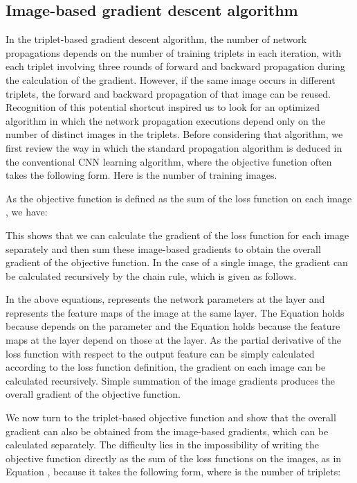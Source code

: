\documentclass[review]{elsarticle}
\begin{document}
\subsection{Image-based gradient descent algorithm}

In the triplet-based gradient descent algorithm, the number of network propagations depends on the number of training triplets in each iteration, with each triplet involving three rounds of forward and backward propagation during the calculation of the gradient. However, if the same image occurs in different triplets, the forward and backward propagation of that image can be reused. Recognition of this potential shortcut inspired us to look for an optimized algorithm in which the network propagation executions depend only on the number of distinct images in the triplets. Before considering that algorithm, we first review the way in which  the standard propagation algorithm is deduced in the conventional CNN learning algorithm, where the objective function often takes the following form. Here  is the number of training images.

As the objective function is defined as the sum of the loss function on each image , we have:

This shows that we can calculate the gradient of the loss function for each image separately and then sum these image-based gradients to obtain the overall gradient of the objective function. In the case of a single image, the gradient can be calculated recursively by the chain rule, which is given as follows.


In the above equations,  represents the network parameters at the  layer and  represents the feature maps of the image  at the same layer. The Equation  holds because  depends on the parameter  and the Equation  holds because the feature maps at the  layer depend on those at the  layer. As the partial derivative of the loss function with respect to the output feature can be simply calculated according to the loss function definition, the gradient on each image can be calculated recursively. Simple summation of the image gradients produces the overall gradient of the objective function.



We now turn to the triplet-based objective function and show that the overall gradient can also be obtained from the image-based gradients, which can be calculated separately. The difficulty lies in the impossibility of writing the objective function directly as the sum of the loss functions on the images, as in Equation , because it takes the following form, where  is the number of triplets: 
\end{document}
